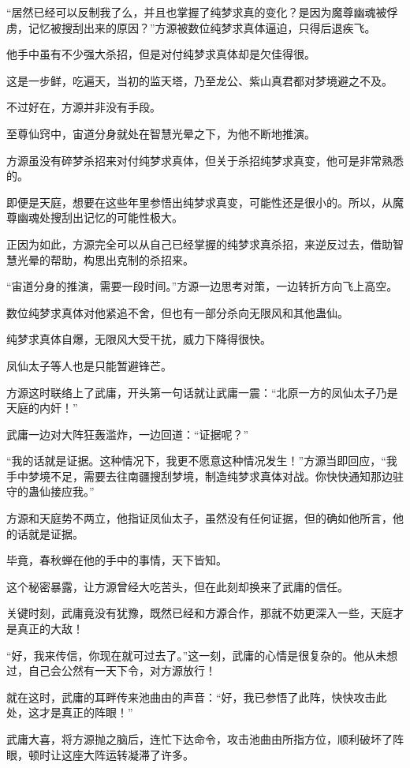 \begin{this_body}
“居然已经可以反制我了么，并且也掌握了纯梦求真的变化？是因为魔尊幽魂被俘虏，记忆被搜刮出来的原因？”方源被数位纯梦求真体逼迫，只得后退疾飞。

他手中虽有不少强大杀招，但是对付纯梦求真体却是欠佳得很。

这是一步鲜，吃遍天，当初的监天塔，乃至龙公、紫山真君都对梦境避之不及。

不过好在，方源并非没有手段。

至尊仙窍中，宙道分身就处在智慧光晕之下，为他不断地推演。

方源虽没有碎梦杀招来对付纯梦求真体，但关于杀招纯梦求真变，他可是非常熟悉的。

即便是天庭，想要在这些年里参悟出纯梦求真变，可能性还是很小的。所以，从魔尊幽魂处搜刮出记忆的可能性极大。

正因为如此，方源完全可以从自己已经掌握的纯梦求真杀招，来逆反过去，借助智慧光晕的帮助，构思出克制的杀招来。

“宙道分身的推演，需要一段时间。”方源一边思考对策，一边转折方向飞上高空。

数位纯梦求真体对他紧追不舍，但也有一部分杀向无限风和其他蛊仙。

纯梦求真体自爆，无限风大受干扰，威力下降得很快。

凤仙太子等人也是只能暂避锋芒。

方源这时联络上了武庸，开头第一句话就让武庸一震：“北原一方的凤仙太子乃是天庭的内奸！”

武庸一边对大阵狂轰滥炸，一边回道：“证据呢？”

“我的话就是证据。这种情况下，我更不愿意这种情况发生！”方源当即回应，“我手中梦境不足，需要去往南疆搜刮梦境，制造纯梦求真体对战。你快快通知那边驻守的蛊仙接应我。”

方源和天庭势不两立，他指证凤仙太子，虽然没有任何证据，但的确如他所言，他的话就是证据。

毕竟，春秋蝉在他的手中的事情，天下皆知。

这个秘密暴露，让方源曾经大吃苦头，但在此刻却换来了武庸的信任。

关键时刻，武庸竟没有犹豫，既然已经和方源合作，那就不妨更深入一些，天庭才是真正的大敌！

“好，我来传信，你现在就可过去了。”这一刻，武庸的心情是很复杂的。他从未想过，自己会公然有一天下令，对方源放行！

就在这时，武庸的耳畔传来池曲由的声音：“好，我已参悟了此阵，快快攻击此处，这才是真正的阵眼！”

武庸大喜，将方源抛之脑后，连忙下达命令，攻击池曲由所指方位，顺利破坏了阵眼，顿时让这座大阵运转凝滞了许多。


\end{this_body}
